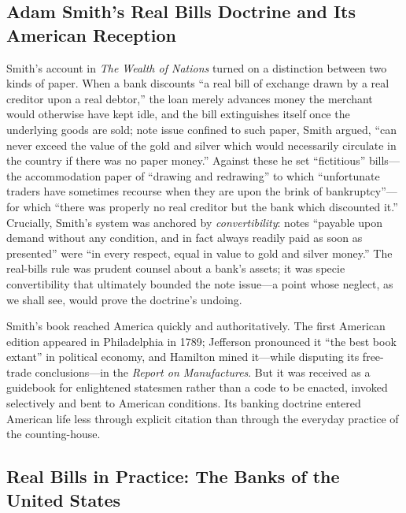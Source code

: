 \documentclass[12pt]{article}
\begin{document}
\subsection{Adam Smith's Real Bills Doctrine and Its American Reception}

Smith's account in \emph{The Wealth of Nations} \citep[Book~II, Ch.~2]{smith1776}
turned on a distinction between two kinds of paper.  When a bank discounts ``a
real bill of exchange drawn by a real creditor upon a real debtor,'' the loan
merely advances money the merchant would otherwise have kept idle, and the bill
extinguishes itself once the underlying goods are sold; note issue confined to
such paper, Smith argued, ``can never exceed the value of the gold and silver
which would necessarily circulate in the country if there was no paper money.''
Against these he set ``fictitious'' bills---the accommodation paper of ``drawing
and redrawing'' to which ``unfortunate traders have sometimes recourse when they
are upon the brink of bankruptcy''---for which ``there was properly no real
creditor but the bank which discounted it.''  Crucially, Smith's system was
anchored by \emph{convertibility}: notes ``payable upon demand without any
condition, and in fact always readily paid as soon as presented'' were ``in every
respect, equal in value to gold and silver money.''  The real-bills rule was
prudent counsel about a bank's assets; it was specie convertibility that
ultimately bounded the note issue---a point whose neglect, as we shall see, would
prove the doctrine's undoing.

Smith's book reached America quickly and authoritatively.  The first American
edition appeared in Philadelphia in 1789; Jefferson pronounced it ``the best book
extant'' in political economy, and Hamilton mined it---while disputing its
free-trade conclusions---in the \emph{Report on Manufactures}.  But it was
received as a guidebook for enlightened statesmen rather than a code to be
enacted, invoked selectively and bent to American conditions.  Its banking
doctrine entered American life less through explicit citation than through the
everyday practice of the counting-house.

\subsection{Real Bills in Practice: The Banks of the United States}
\end{document}
